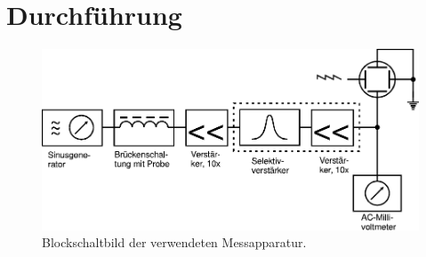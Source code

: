 \section{Durchführung}
\label{sec:durchführung}

\begin{figure}[H]
	\centering
	\includegraphics[width=1\linewidth]{content/grafik/schaltbild.pdf}
	\caption{Blockschaltbild der verwendeten Messapparatur.}
	\label{fig:schaltbild}
\end{figure}
